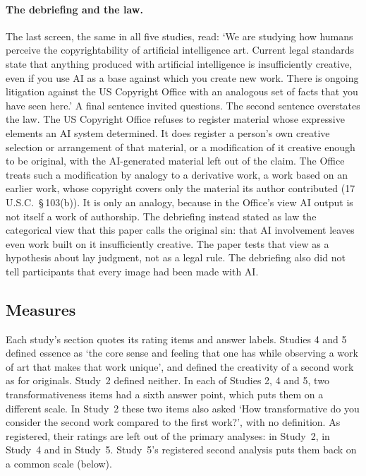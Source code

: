 \paragraph*{The debriefing and the law.}
The last screen, the same in all five studies, read: `We are studying how humans perceive the copyrightability of artificial intelligence art. Current legal standards state that anything produced with artificial intelligence is insufficiently creative, even if you use AI as a base against which you create new work. There is ongoing litigation against the US Copyright Office with an analogous set of facts that you have seen here.' A final sentence invited questions. The second sentence overstates the law. The US Copyright Office refuses to register material whose expressive elements an AI system determined. It does register a person's own creative selection or arrangement of that material, or a modification of it creative enough to be original, with the AI-generated material left out of the claim.\cite{usco2023guidance,usco2025copyrightability} The Office treats such a modification by analogy to a derivative work, a work based on an earlier work, whose copyright covers only the material its author contributed (17 U.S.C.~\S\,103(b)). It is only an analogy, because in the Office's view AI output is not itself a work of authorship.\cite{usco2025copyrightability} The debriefing instead stated as law the categorical view that this paper calls the original sin: that AI involvement leaves even work built on it insufficiently creative. The paper tests that view as a hypothesis about lay judgment, not as a legal rule. The debriefing also did not tell participants that every image had been made with AI.

\subsection*{Measures}

Each study's section quotes its rating items and answer labels. Studies 4 and 5 defined essence as `the core sense and feeling that one has while observing a work of art that makes that work unique', and defined the creativity of a second work as for originals. Study~2 defined neither. In each of Studies 2, 4 and 5, two transformativeness items had a sixth answer point, which puts them on a different scale. In Study~2 these two items also asked `How transformative do you consider the second work compared to the first work?', with no definition. As registered, their ratings are left out of the primary analyses: \STwoNSixPointDropped{} in Study~2, \SFourNSixPointDropped{} in Study~4 and \SFiveNSixPointDropped{} in Study~5. Study~5's registered second analysis puts them back on a common scale (below).

